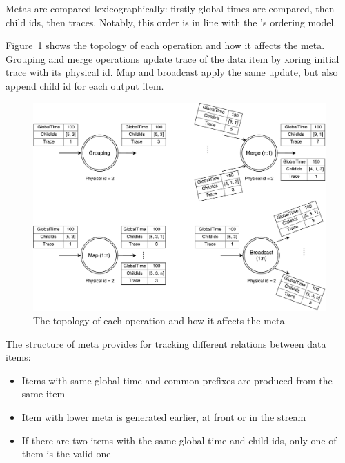 
Metas are compared lexicographically: firstly global times are compared, then child ids, then traces. Notably, this order is in line with the \FlameStream's ordering model.

Figure~\ref{logical-graph-ops-figure} shows the topology of each operation and how it affects the meta. Grouping and merge operations update trace of the data item by xoring initial trace with its physical id. Map and broadcast apply the same update, but also append child id for each output item.

\begin{figure}[ht]
  \centering
  \includegraphics[width=\linewidth]{pics/operations}
  \caption{The topology of each operation and how it affects the meta}
  \label {logical-graph-ops-figure}
\end{figure}

The structure of meta provides for tracking different relations between data items:

\begin{itemize}
  \item Items with same global time and common prefixes are produced from the same item
  \item Item with lower meta is generated earlier, at front or in the stream
  \item If there are two items with the same global time and child ids, only one of them is the valid one
\end{itemize}

\label{mininal-time}


